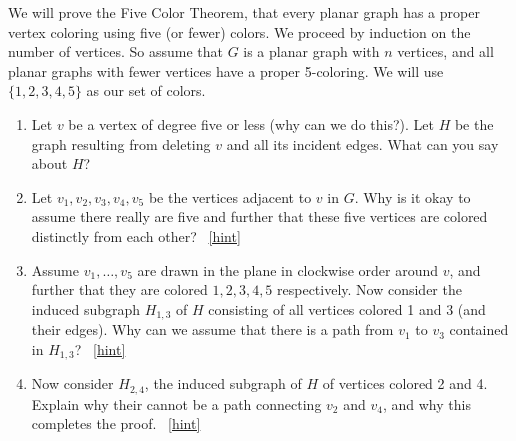 \documentclass{book}
\begin{document}
\setcounter{project}{39}
\addtocounter{project}{-1}
\begin{activity}[]\label{activity-32}
\hypertarget{p-374}{}%
We will prove the Five Color Theorem, that every planar graph has a proper vertex coloring using five (or fewer) colors.  We proceed by induction on the number of vertices.  So assume that \(G\) is a planar graph with \(n\) vertices, and all planar graphs with fewer vertices have a proper 5-coloring.  We will use \(\{1,2,3,4,5\}\) as our set of colors.%
\begin{enumerate}[font=\bfseries,label=(\alph*),ref=\alph*]
\item\label{task-51} \hypertarget{p-375}{}%
Let \(v\) be a vertex of degree five or less (why can we do this?).  Let \(H\) be the graph resulting from deleting \(v\) and all its incident edges.  What can you say about \(H\)?%
\item\label{task-52} \hypertarget{p-376}{}%
Let \(v_1, v_2, v_3, v_4, v_5\) be the vertices adjacent to \(v\) in \(G\).  Why is it okay to assume there really are five and further that these five vertices are colored distinctly from each other?%
~\hfill{\tiny\hyperlink{a-39.b}{[hint]}\hypertarget{q-39.b}{}}\item\label{task-53} \hypertarget{p-378}{}%
Assume \(v_1, \ldots, v_5\) are drawn in the plane in clockwise order around \(v\), and further that they are colored \(1,2,3,4,5\) respectively.  Now consider the induced subgraph \(H_{1,3}\) of \(H\) consisting of all vertices colored 1 and 3 (and their edges).  Why can we assume that there is a path from \(v_1\) to \(v_3\) contained in \(H_{1,3}\)?%
~\hfill{\tiny\hyperlink{a-39.c}{[hint]}\hypertarget{q-39.c}{}}\item\label{task-54} \hypertarget{p-380}{}%
Now consider \(H_{2,4}\), the induced subgraph of \(H\) of vertices colored 2 and 4.  Explain why their cannot be a path connecting \(v_2\) and \(v_4\), and why this completes the proof.%
~\hfill{\tiny\hyperlink{a-39.d}{[hint]}\hypertarget{q-39.d}{}}\end{enumerate}
\end{activity}
\end{document}
